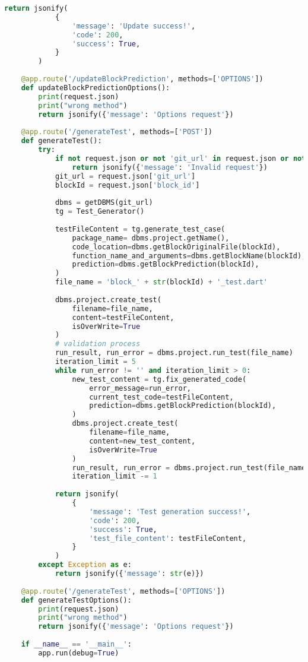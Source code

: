 \begin{lstlisting}[language=Python, caption={$\texttt{main.py}$ file.}, label={lst:15}]
        return jsonify(
            {
                'message': 'Update success!',
                'code': 200,
                'success': True,
            }
        )
    
    @app.route('/updateBlockPrediction', methods=['OPTIONS'])
    def updateBlockPredictionOptions():
        print(request.json)
        print("wrong method")
        return jsonify({'message': 'Options request'})
        
    @app.route('/generateTest', methods=['POST'])
    def generateTest():
        try:
            if not request.json or not 'git_url' in request.json or not 'block_id' in request.json:
                return jsonify({'message': 'Invalid request'})
            git_url = request.json['git_url']
            blockId = request.json['block_id']
            
            dbms = getDBMS(git_url)
            tg = Test_Generator()
            
            testFileContent = tg.generate_test_case(
                package_name= dbms.project.getName(),
                code_location=dbms.getBlockOriginalFile(blockId),
                function_name_and_arguments=dbms.getBlockName(blockId),
                prediction=dbms.getBlockPrediction(blockId),
            )
            file_name = 'block_' + str(blockId) + '_test.dart'
            
            dbms.project.create_test(
                filename=file_name,
                content=testFileContent,
                isOverWrite=True
            )
            # validation process
            run_result, run_error = dbms.project.run_test(file_name)
            iteration_limit = 5
            while run_error != '' and iteration_limit > 0:
                new_test_content = tg.fix_generated_code(
                    error_message=run_error,
                    current_test_code=testFileContent,
                    prediction=dbms.getBlockPrediction(blockId),
                )
                dbms.project.create_test(
                    filename=file_name,
                    content=new_test_content,
                    isOverWrite=True
                )
                run_result, run_error = dbms.project.run_test(file_name)
                iteration_limit -= 1
            
            return jsonify(
                {
                    'message': 'Test generation success!',
                    'code': 200,
                    'success': True,
                    'test_file_content': testFileContent,
                }
            )
        except Exception as e:
            return jsonify({'message': str(e)})
    
    @app.route('/generateTest', methods=['OPTIONS'])
    def generateTestOptions():
        print(request.json)
        print("wrong method")
        return jsonify({'message': 'Options request'})
        
    if __name__ == '__main__':
        app.run(debug=True)
\end{lstlisting}

